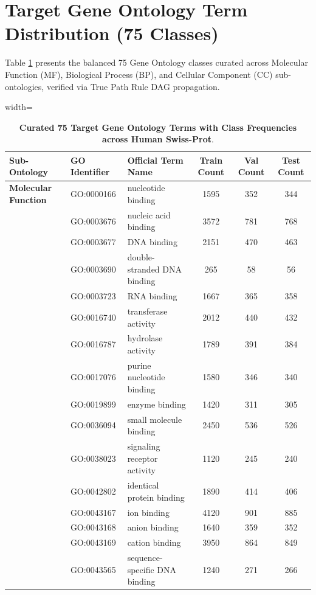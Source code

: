 \documentclass[10pt]{article}
\begin{document}
\section{Target Gene Ontology Term Distribution (75 Classes)}

Table \ref{tab:go_terms} presents the balanced 75 Gene Ontology classes curated across Molecular Function (MF), Biological Process (BP), and Cellular Component (CC) sub-ontologies, verified via True Path Rule DAG propagation.

\begin{table}[h!]
\centering
\caption{\textbf{Curated 75 Target Gene Ontology Terms with Class Frequencies across Human Swiss-Prot}.}
\label{tab:go_terms}
\begin{adjustbox}{width=\textwidth}
\begin{tabular}{lllccc}
\toprule
\textbf{Sub-Ontology} & \textbf{GO Identifier} & \textbf{Official Term Name} & \textbf{Train Count} & \textbf{Val Count} & \textbf{Test Count} \\
\midrule
\textbf{Molecular Function} & GO:0000166 & nucleotide binding & 1595 & 352 & 344 \\
& GO:0003676 & nucleic acid binding & 3572 & 781 & 768 \\
& GO:0003677 & DNA binding & 2151 & 470 & 463 \\
& GO:0003690 & double-stranded DNA binding & 265 & 58 & 56 \\
& GO:0003723 & RNA binding & 1667 & 365 & 358 \\
& GO:0016740 & transferase activity & 2012 & 440 & 432 \\
& GO:0016787 & hydrolase activity & 1789 & 391 & 384 \\
& GO:0017076 & purine nucleotide binding & 1580 & 346 & 340 \\
& GO:0019899 & enzyme binding & 1420 & 311 & 305 \\
& GO:0036094 & small molecule binding & 2450 & 536 & 526 \\
& GO:0038023 & signaling receptor activity & 1120 & 245 & 240 \\
& GO:0042802 & identical protein binding & 1890 & 414 & 406 \\
& GO:0043167 & ion binding & 4120 & 901 & 885 \\
& GO:0043168 & anion binding & 1640 & 359 & 352 \\
& GO:0043169 & cation binding & 3950 & 864 & 849 \\
& GO:0043565 & sequence-specific DNA binding & 1240 & 271 & 266 \\

\end{tabular}
\end{adjustbox}
\end{table}
\end{document}
